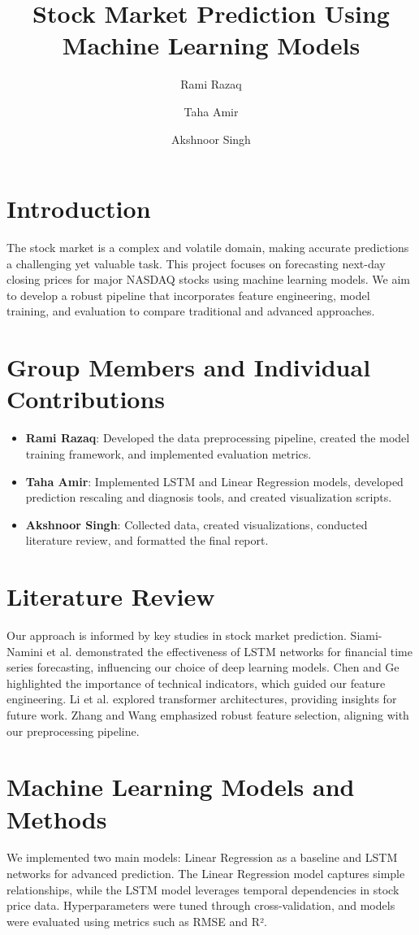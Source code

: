 \documentclass[sigconf]{acmart}
\title{Stock Market Prediction Using Machine Learning Models}
\author{Rami Razaq}
\affiliation{
  \institution{University of Example}
  \city{City}
  \country{Country}
}
\author{Taha Amir}
\affiliation{
  \institution{University of Example}
  \city{City}
  \country{Country}
}
\author{Akshnoor Singh}
\affiliation{
  \institution{University of Example}
  \city{City}
  \country{Country}
}
\begin{document}
\maketitle

\section{Introduction}
The stock market is a complex and volatile domain, making accurate predictions a challenging yet valuable task. This project focuses on forecasting next-day closing prices for major NASDAQ stocks using machine learning models. We aim to develop a robust pipeline that incorporates feature engineering, model training, and evaluation to compare traditional and advanced approaches.

\section{Group Members and Individual Contributions}
\begin{itemize}
    \item \textbf{Rami Razaq}: Developed the data preprocessing pipeline, created the model training framework, and implemented evaluation metrics.
    \item \textbf{Taha Amir}: Implemented LSTM and Linear Regression models, developed prediction rescaling and diagnosis tools, and created visualization scripts.
    \item \textbf{Akshnoor Singh}: Collected data, created visualizations, conducted literature review, and formatted the final report.
\end{itemize}

\section{Literature Review}
Our approach is informed by key studies in stock market prediction. Siami-Namini et al. demonstrated the effectiveness of LSTM networks for financial time series forecasting, influencing our choice of deep learning models. Chen and Ge highlighted the importance of technical indicators, which guided our feature engineering. Li et al. explored transformer architectures, providing insights for future work. Zhang and Wang emphasized robust feature selection, aligning with our preprocessing pipeline.

\section{Machine Learning Models and Methods}
We implemented two main models: Linear Regression as a baseline and LSTM networks for advanced prediction. The Linear Regression model captures simple relationships, while the LSTM model leverages temporal dependencies in stock price data. Hyperparameters were tuned through cross-validation, and models were evaluated using metrics such as RMSE and R².
\end{document}
